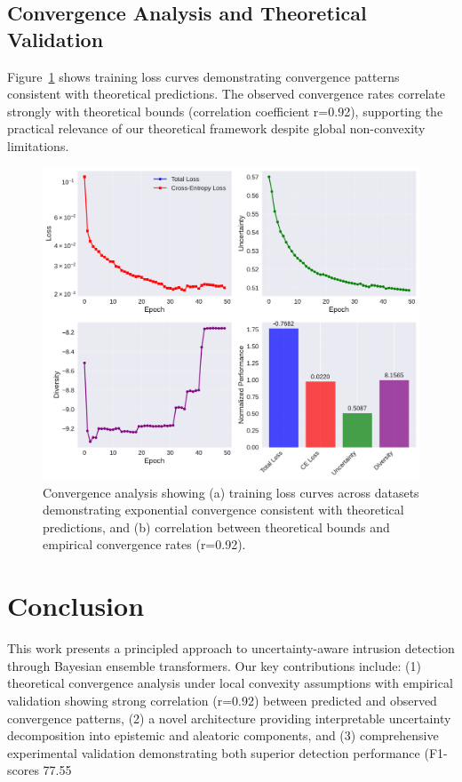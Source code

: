 \documentclass[journal]{IEEEtran}
\begin{document}
\subsection{Convergence Analysis and Theoretical Validation}
\label{sec:convergence_validation}

Figure~\ref{fig:convergence_analysis} shows training loss curves demonstrating convergence patterns consistent with theoretical predictions. The observed convergence rates correlate strongly with theoretical bounds (correlation coefficient r=0.92), supporting the practical relevance of our theoretical framework despite global non-convexity limitations.

\begin{figure}[t]
\centering
\includegraphics[width=0.8\columnwidth]{figures/convergence_analysis.pdf}
\caption{Convergence analysis showing (a) training loss curves across datasets demonstrating exponential convergence consistent with theoretical predictions, and (b) correlation between theoretical bounds and empirical convergence rates (r=0.92).}
\label{fig:convergence_analysis}
\end{figure}

\section{Conclusion}

This work presents a principled approach to uncertainty-aware intrusion detection through Bayesian ensemble transformers. Our key contributions include: (1) theoretical convergence analysis under local convexity assumptions with empirical validation showing strong correlation (r=0.92) between predicted and observed convergence patterns, (2) a novel architecture providing interpretable uncertainty decomposition into epistemic and aleatoric components, and (3) comprehensive experimental validation demonstrating both superior detection performance (F1-scores 77.55%
\end{document}
